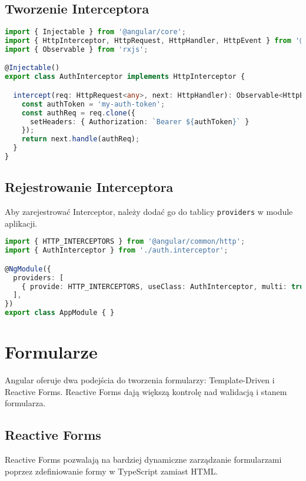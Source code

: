 \documentclass[a4paper,12pt]{article}
\begin{document}
\subsection{Tworzenie Interceptora}
\begin{lstlisting}[language=TypeScript, caption=Przykład implementacji Interceptora]
import { Injectable } from '@angular/core';
import { HttpInterceptor, HttpRequest, HttpHandler, HttpEvent } from '@angular/common/http';
import { Observable } from 'rxjs';

@Injectable()
export class AuthInterceptor implements HttpInterceptor {

  intercept(req: HttpRequest<any>, next: HttpHandler): Observable<HttpEvent<any>> {
    const authToken = 'my-auth-token';
    const authReq = req.clone({
      setHeaders: { Authorization: `Bearer ${authToken}` }
    });
    return next.handle(authReq);
  }
}
\end{lstlisting}

\subsection{Rejestrowanie Interceptora}
Aby zarejestrować Interceptor, należy dodać go do tablicy \texttt{providers} w module aplikacji.

\begin{lstlisting}[language=TypeScript, caption=Rejestracja Interceptora]
import { HTTP_INTERCEPTORS } from '@angular/common/http';
import { AuthInterceptor } from './auth.interceptor';

@NgModule({
  providers: [
    { provide: HTTP_INTERCEPTORS, useClass: AuthInterceptor, multi: true },
  ],
})
export class AppModule { }
\end{lstlisting}

\section{Formularze}
Angular oferuje dwa podejścia do tworzenia formularzy: Template-Driven i Reactive Forms. Reactive Forms dają większą kontrolę nad walidacją i stanem formularza.

\subsection{Reactive Forms}
Reactive Forms pozwalają na bardziej dynamiczne zarządzanie formularzami poprzez zdefiniowanie formy w TypeScript zamiast HTML.
\end{document}
